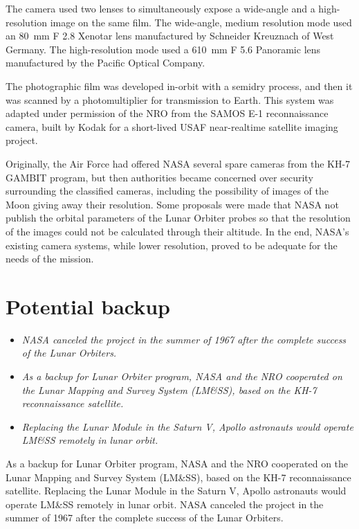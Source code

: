The camera used two lenses to simultaneously expose a wide-angle and a
high-resolution image on the same film. The wide-angle, medium
resolution mode used an 80~mm F 2.8 Xenotar lens manufactured by
Schneider Kreuznach of West Germany. The high-resolution mode used a
610~mm F 5.6 Panoramic lens manufactured by the Pacific Optical Company.

The photographic film was developed in-orbit with a semidry process, and
then it was scanned by a photomultiplier for transmission to Earth. This
system was adapted under permission of the NRO from the SAMOS E-1
reconnaissance camera, built by Kodak for a short-lived USAF
near-realtime satellite imaging project.

Originally, the Air Force had offered NASA several spare cameras from
the KH-7 GAMBIT program, but then authorities became concerned over
security surrounding the classified cameras, including the possibility
of images of the Moon giving away their resolution. Some proposals were
made that NASA not publish the orbital parameters of the Lunar Orbiter
probes so that the resolution of the images could not be calculated
through their altitude. In the end, NASA's existing camera systems,
while lower resolution, proved to be adequate for the needs of the
mission.

\section{Potential backup}\label{potential-backup}

\begin{itemize}
\item
  \emph{NASA canceled the project in the summer of 1967 after the
  complete success of the Lunar Orbiters.}
\item
  \emph{As a backup for Lunar Orbiter program, NASA and the NRO
  cooperated on the Lunar Mapping and Survey System (LM\&SS), based on
  the KH-7 reconnaissance satellite.}
\item
  \emph{Replacing the Lunar Module in the Saturn V, Apollo astronauts
  would operate LM\&SS remotely in lunar orbit.}
\end{itemize}

As a backup for Lunar Orbiter program, NASA and the NRO cooperated on
the Lunar Mapping and Survey System (LM\&SS), based on the KH-7
reconnaissance satellite. Replacing the Lunar Module in the Saturn V,
Apollo astronauts would operate LM\&SS remotely in lunar orbit. NASA
canceled the project in the summer of 1967 after the complete success of
the Lunar Orbiters.

